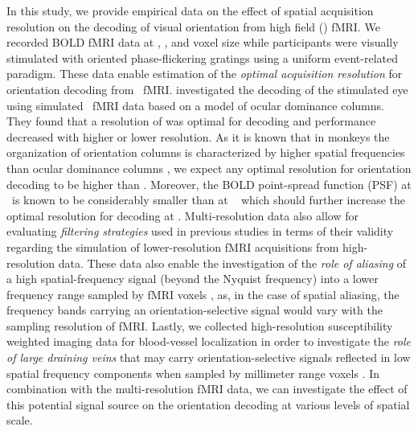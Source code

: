 In this study, we provide empirical data on the effect of spatial acquisition
resolution on the decoding of visual orientation from high field (\sevenT)
fMRI. We recorded BOLD fMRI data at , ,  and  voxel
size while participants were visually stimulated with oriented phase-flickering
gratings using a uniform event-related paradigm.
These data enable estimation of the \textit{optimal acquisition resolution} for
orientation decoding from \sevenT\ fMRI.  \citet{chaimow_2011} investigated the
decoding of the stimulated eye using simulated \threeT\ fMRI data based
on a model of ocular dominance columns. They found that a resolution of 
was optimal for decoding and performance decreased with higher or lower
resolution.  As it is known that in monkeys the organization of orientation
columns is characterized by higher spatial frequencies than ocular dominance
columns \citep{obermayer_1993}, we expect any optimal resolution for
orientation decoding to be higher than . Moreover, the BOLD point-spread
function (PSF) at \sevenT\ is known to be considerably smaller than at \threeT\
\citep[ FWHM vs.   FWHM][]{shmuel_2007,
engel_1997} which should further increase the optimal resolution for decoding
at \sevenT.
Multi-resolution data also allow for evaluating \textit{filtering strategies}
used in previous studies in terms of their validity regarding the simulation of
lower-resolution fMRI acquisitions from high-resolution data.
These data also enable the investigation of the \textit{role of aliasing} of a
high spatial-frequency signal (beyond the Nyquist frequency) into a
lower frequency range sampled by fMRI voxels \citep[sometimes referred to as
“hyperacuity”;][]{swisher_2010,opdebeeck_2010}, as, in the case of spatial
aliasing, the frequency bands carrying an orientation-selective signal would
vary with the sampling resolution of fMRI.
Lastly, we collected high-resolution susceptibility weighted imaging data for
blood-vessel localization in order to investigate the \textit{role of large
draining veins} that may carry orientation-selective signals reflected in low
spatial frequency components when sampled by millimeter range voxels
\citep{kamitani_2005,kriegeskorte_2007,shmuel_2010, gardner_2010}. In
combination with the multi-resolution fMRI data, we can investigate the effect
of this potential signal source on the orientation decoding at various levels
of spatial scale.



